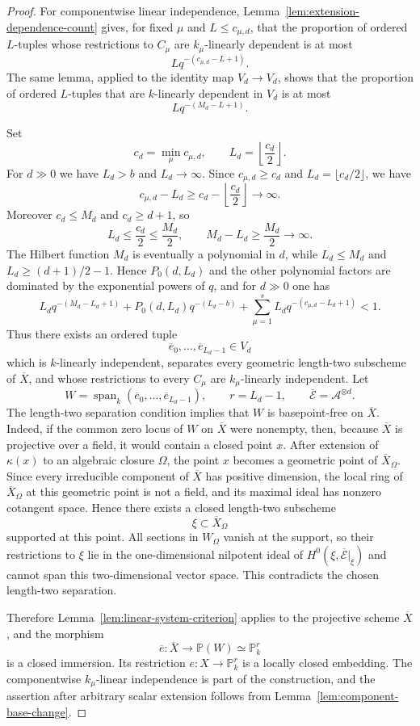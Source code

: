 \documentclass{lms}
\DeclareMathOperator{\Span}{span}
\newcommand{\PP}{\mathbb P}
\newcommand{\Ample}{\mathcal A}
\newcommand{\EE}{\mathcal E}
\newcommand{\kk}{\kappa}
\newcommand{\barX}{\overline{X}}
\begin{document}
\begin{proof}
For componentwise linear independence, Lemma~\ref{lem:extension-dependence-count} gives, for fixed $\mu$ and $L\le c_{\mu,d}$, that the proportion of ordered $L$-tuples whose restrictions to $C_\mu$ are $k_\mu$-linearly dependent is at most
\[
        Lq^{-(c_{\mu,d}-L+1)}.
\]
The same lemma, applied to the identity map $V_d\to V_d$, shows that the proportion of ordered $L$-tuples that are $k$-linearly dependent in $V_d$ is at most
\[
        Lq^{-(M_d-L+1)}.
\]

Set
\[
        c_d=\min_\mu c_{\mu,d},
        \qquad
        L_d=\left\lfloor \frac{c_d}{2}\right\rfloor .
\]
For $d\gg0$ we have $L_d>b$ and $L_d\to\infty$.  Since $c_{\mu,d}\ge c_d$ and $L_d=\lfloor c_d/2\rfloor$, we have
\[
        c_{\mu,d}-L_d\ge c_d-\left\lfloor\frac{c_d}{2}\right\rfloor\longrightarrow\infty.
\]
Moreover $c_d\le M_d$ and $c_d\ge d+1$, so
\[
        L_d\le\frac{c_d}{2}\le\frac{M_d}{2},
        \qquad
        M_d-L_d\ge\frac{M_d}{2}\longrightarrow\infty.
\]
The Hilbert function $M_d$ is eventually a polynomial in $d$, while $L_d\le M_d$ and $L_d\ge(d+1)/2-1$.  Hence $P_0(d,L_d)$ and the other polynomial factors are dominated by the exponential powers of $q$, and for $d\gg0$ one has
\[
        L_dq^{-(M_d-L_d+1)}
        +P_0(d,L_d)q^{-(L_d-b)}
        +\sum_{\mu=1}^s L_dq^{-(c_{\mu,d}-L_d+1)}
        <1.
\]
Thus there exists an ordered tuple
\[
        \overline e_0,\ldots,\overline e_{L_d-1}\in V_d
\]
which is $k$-linearly independent, separates every geometric length-two subscheme of $\barX$, and whose restrictions to every $C_\mu$ are $k_\mu$-linearly independent.  Let
\[
        W=\Span_k(\overline e_0,\ldots,\overline e_{L_d-1}),
        \qquad
        r=L_d-1,
        \qquad
        \overline{\EE}=\Ample^{\otimes d}.
\]
The length-two separation condition implies that $W$ is basepoint-free on $\barX$.  Indeed, if the common zero locus of $W$ on $\barX$ were nonempty, then, because $\barX$ is projective over a field, it would contain a closed point $x$.  After extension of $\kk(x)$ to an algebraic closure $\Omega$, the point $x$ becomes a geometric point of $\barX_\Omega$.  Since every irreducible component of $\barX$ has positive dimension, the local ring of $\barX_\Omega$ at this geometric point is not a field, and its maximal ideal has nonzero cotangent space.  Hence there exists a closed length-two subscheme
\[
        \xi\subset\barX_\Omega
\]
supported at this point.  All sections in $W_\Omega$ vanish at the support, so their restrictions to $\xi$ lie in the one-dimensional nilpotent ideal of $H^0(\xi,\overline{\EE}|_\xi)$ and cannot span this two-dimensional vector space.  This contradicts the chosen length-two separation.

Therefore Lemma~\ref{lem:linear-system-criterion} applies to the projective scheme $\barX$, and the morphism
\[
        \overline e:\barX\to\PP(W)\simeq\PP^r_k
\]
is a closed immersion.  Its restriction $e:X\to\PP^r_k$ is a locally closed embedding.  The componentwise $k_\mu$-linear independence is part of the construction, and the assertion after arbitrary scalar extension follows from Lemma~\ref{lem:component-base-change}.
\end{proof}
\end{document}
